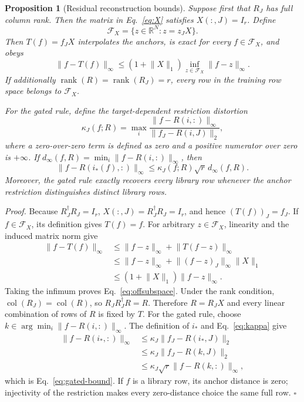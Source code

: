 \documentclass[10pt,letterpaper,twoside]{article}
\newtheorem{proposition}{Proposition}
\newcommand{\RR}{\mathbb{R}}
\newcommand{\norm}[1]{\lVert#1\rVert}
\begin{document}
\begin{proposition}[Residual reconstruction bounds]
Suppose first that $R_J$ has full column rank.  Then the matrix in
Eq.~\eqref{eq:X} satisfies $X(:,J)=I_r$.  Define
\begin{equation}
\mathcal F_X=\{z\in\RR^N:z=z_JX\}.
\end{equation}
Then $T(f)=f_JX$ interpolates the anchors, is exact for every
$f\in\mathcal F_X$, and obeys
\begin{equation}
\norm{f-T(f)}_\infty
\le (1+\norm{X}_1)
\inf_{z\in\mathcal F_X}\norm{f-z}_\infty.
\label{eq:offsubspace}
\end{equation}
If additionally $\operatorname{rank}(R)=\operatorname{rank}(R_J)=r$, every
row in the training row space belongs to $\mathcal F_X$.

For the gated rule, define the target-dependent restriction distortion
\begin{equation}
\kappa_J(f;R)=\max_i
\frac{\norm{f-R(i,:)}_\infty}{\norm{f_J-R(i,J)}_2},
\label{eq:kappa}
\end{equation}
where a zero-over-zero term is defined as zero and a positive numerator over
zero is $+\infty$.  If
$d_\infty(f,R)=\min_i\norm{f-R(i,:)}_\infty$, then
\begin{equation}
\norm{f-R(i_*(f),:)}_\infty
\le \kappa_J(f;R)\sqrt r\,d_\infty(f,R).
\label{eq:gated-bound}
\end{equation}
Moreover, the gated rule exactly recovers every library row whenever the
anchor restriction distinguishes distinct library rows.
\end{proposition}

\noindent\textit{Proof.}
Because $R_J^\dagger R_J=I_r$,
$X(:,J)=R_J^\dagger R_J=I_r$, and hence
$(T(f))_J=f_J$.  If $f\in\mathcal F_X$, its definition gives $T(f)=f$.
For arbitrary $z\in\mathcal F_X$, linearity and the induced matrix norm give
\begin{align}
\norm{f-T(f)}_\infty
&\le \norm{f-z}_\infty+\norm{T(f-z)}_\infty\\
&\le \norm{f-z}_\infty+\norm{(f-z)_J}_\infty\norm{X}_1\\
&\le(1+\norm{X}_1)\norm{f-z}_\infty.
\end{align}
Taking the infimum proves Eq.~\eqref{eq:offsubspace}.  Under the rank
condition, $\operatorname{col}(R_J)=\operatorname{col}(R)$, so
$R_JR_J^\dagger R=R$.  Therefore
$R=R_JX$ and every linear combination of rows of $R$ is fixed by $T$.
For the gated rule, choose
$k\in\arg\min_i\norm{f-R(i,:)}_\infty$.  The definition of $i_*$ and
Eq.~\eqref{eq:kappa} give
\begin{align}
\norm{f-R(i_*,:)}_\infty
&\le\kappa_J\norm{f_J-R(i_*,J)}_2\\
&\le\kappa_J\norm{f_J-R(k,J)}_2\\
&\le\kappa_J\sqrt r\norm{f-R(k,:)}_\infty,
\end{align}
which is Eq.~\eqref{eq:gated-bound}.  If $f$ is a library row, its anchor
distance is zero; injectivity of the restriction makes every zero-distance
choice the same full row. \hfill$\square$
\end{document}
